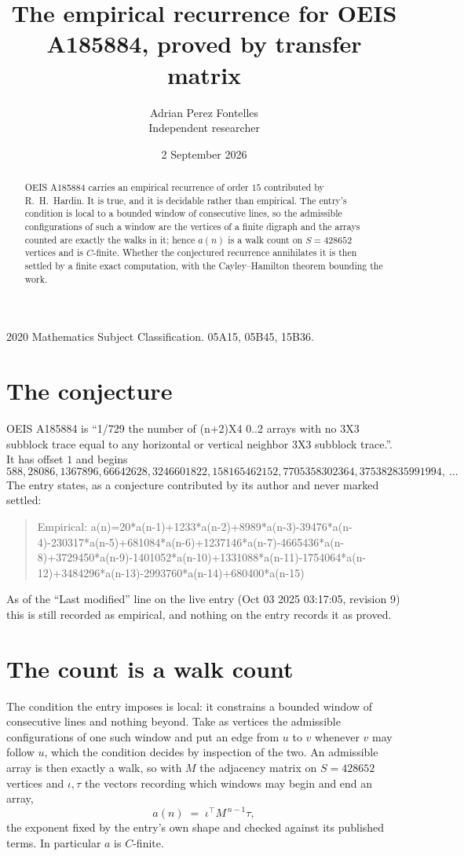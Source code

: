 \documentclass[11pt,a4paper]{article}
\title{The empirical recurrence for OEIS A185884, proved by transfer matrix}
\author{Adrian Perez Fontelles\\ \small Independent researcher}
\date{2 September 2026}
\theoremstyle{plain}
\theoremstyle{definition}
\begin{document}
\maketitle

\begin{abstract}
OEIS A185884 carries an empirical recurrence of order $15$ contributed by R.~H.~Hardin. It is
true, and it is decidable rather than empirical. The entry's condition is local to a bounded window of consecutive lines, so
the admissible configurations of such a window are the vertices of a finite digraph and the
arrays counted are exactly the walks in it; hence $a(n)$ is a walk count on $S=428652$ vertices
and is $C$-finite. Whether the conjectured recurrence annihilates it is then settled by a
finite exact computation, with the Cayley--Hamilton theorem bounding the work.
\end{abstract}

\noindent\small 2020 Mathematics Subject Classification. 05A15, 05B45, 15B36.\normalsize

\section{The conjecture}

OEIS A185884 is ``1/729 the number of (n+2)X4 0..2 arrays with no 3X3 subblock trace equal to any horizontal or vertical neighbor 3X3 subblock trace.''. It has offset $1$ and begins
\[
588, 28086, 1367896, 66642628, 3246601822, 158165462152, 7705358302364, 375382835991994,\ \dots
\]
The entry states, as a conjecture contributed by its author and never marked settled:
\begin{quote}
Empirical: a(n)=20*a(n-1)+1233*a(n-2)+8989*a(n-3)-39476*a(n-4)-230317*a(n-5)+681084*a(n-6)+1237146*a(n-7)-4665436*a(n-8)+3729450*a(n-9)-1401052*a(n-10)+1331088*a(n-11)-1754064*a(n-12)+3484296*a(n-13)-2993760*a(n-14)+680400*a(n-15)
\end{quote}
As of the ``Last modified'' line on the live entry (Oct 03 2025 03:17:05, revision 9) this is still
recorded as empirical, and nothing on the entry records it as proved.

\section{The count is a walk count}

The condition the entry imposes is local: it constrains a bounded window of consecutive lines and nothing beyond. Take as
vertices the admissible configurations of one such window and put an edge from $u$ to $v$
whenever $v$ may follow $u$, which the condition decides by inspection of the two. An
admissible array is then exactly a walk, so with $M$ the adjacency matrix on $S=428652$ vertices
and $\iota,\tau$ the vectors recording which windows may begin and end an array,
\[
a(n)\;=\;\iota^{\!\top}M^{\,n-1}\tau ,
\]
the exponent fixed by the entry's own shape and checked against its published terms. In
particular $a$ is $C$-finite.
\end{document}
